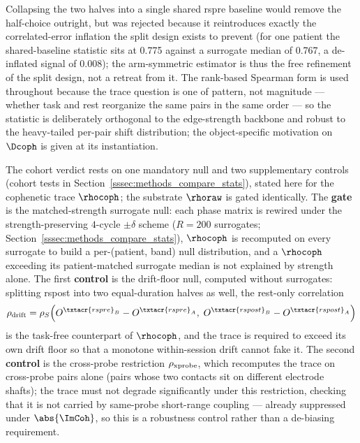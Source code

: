 Collapsing the two halves into a single shared \acrshort{rspre} baseline would remove the half-choice outright, but was rejected because it reintroduces exactly the correlated-error inflation the split design exists to prevent (for one patient the shared-baseline statistic sits at \num{0.775} against a surrogate median of \num{0.767}, a de-inflated signal of \num{0.008}); the arm-symmetric estimator is thus the free refinement of the split design, not a retreat from it. The rank-based Spearman form is used throughout because the trace question is one of pattern, not magnitude --- whether task and rest reorganize the same pairs in the same order --- so the statistic is deliberately orthogonal to the edge-strength backbone and robust to the heavy-tailed per-pair shift distribution; the object-specific motivation on \(\Dcoph\) is given at its instantiation.

The cohort verdict rests on one mandatory null and two supplementary controls (cohort tests in Section~\ref{sssec:methods_compare_stats}), stated here for the cophenetic trace \(\rhocoph\); the substrate \(\rhoraw\) is gated identically. The \textbf{gate} is the matched-strength surrogate null: each phase matrix is rewired under the strength-preserving \(4\)-cycle \(\pm\delta\) scheme (\(R = 200\) surrogates; Section~\ref{sssec:methods_compare_stats}), \(\rhocoph\) is recomputed on every surrogate to build a per-(patient, band) null distribution, and a \(\rhocoph\) exceeding its patient-matched surrogate median is not explained by strength alone. The first \textbf{control} is the drift-floor null, computed without surrogates: splitting \acrshort{rspost} into two equal-duration halves as well, the rest-only correlation
\begin{equation}
    \rho_{\rm drift} = \rho_{S}\!\left(O^{\txtacr{rspre}_{B}} - O^{\txtacr{rspre}_{A}},\; O^{\txtacr{rspost}_{B}} - O^{\txtacr{rspost}_{A}}\right)
    \label{eq:methods_perpair_drift}
\end{equation}
is the task-free counterpart of \(\rhocoph\), and the trace is required to exceed its own drift floor so that a monotone within-session drift cannot fake it. The second \textbf{control} is the cross-probe restriction \(\rho_{\rm xprobe}\), which recomputes the trace on cross-probe pairs alone (pairs whose two contacts sit on different electrode shafts); the trace must not degrade significantly under this restriction, checking that it is not carried by same-probe short-range coupling --- already suppressed under \(\abs{\ImCoh}\), so this is a robustness control rather than a de-biasing requirement.



